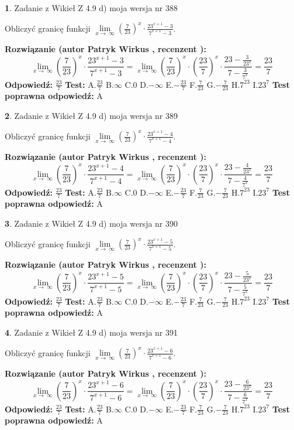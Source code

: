 \documentclass[12pt, a4paper]{article}
\theoremstyle{definition} %
\newtheorem{zad}{}
\newcommand{\zadStart}[1]{\begin{zad}#1\newline}
\newcommand{\zadStop}{\end{zad}}
\newcommand{\rozwStart}[2]{\noindent \textbf{Rozwiązanie (autor #1 , recenzent #2): }\newline}
\newcommand{\rozwStop}{\newline}
\newcommand{\odpStart}{\noindent \textbf{Odpowiedź:}\newline}
\newcommand{\odpStop}{\newline}
\newcommand{\testStart}{\noindent \textbf{Test:}\newline}
\newcommand{\testStop}{\newline}
\newcommand{\kluczStart}{\noindent \textbf{Test poprawna odpowiedź:}\newline}
\newcommand{\kluczStop}{\newline}
\begin{document}
\zadStart{Zadanie z Wikieł Z 4.9 d) moja wersja nr 388}


Obliczyć granicę funkcji  $\lim\limits_{x\to\ \infty}(\frac{7}{23})^{x}\cdot\frac{23^{x+1}-3}{7^{x+1}-3}$.
\zadStop
\rozwStart{Patryk Wirkus}{}
$$\lim\limits_{x\to\ \infty}(\frac{7}{23})^{x}\cdot\frac{23^{x+1}-3}{7^{x+1}-3}=\lim\limits_{x\to\ \infty}(\frac{7}{23})^{x}\cdot(\frac{23}{7})^{x} \cdot \frac{23-\frac{3}{23^{x}}}{7-\frac{3}{7^{x}}} = \frac{23}{7}$$
\rozwStop
\odpStart
$\frac{23}{7}$
\odpStop
\testStart
A.$\frac{23}{7}$ B.$\infty$ C.$0$ D.$-\infty$ E.$-\frac{23}{7}$
F.$\frac{7}{23}$ G.$-\frac{7}{23}$
H.$7^{23}$
I.$23^{7}$
\testStop
\kluczStart
A
\kluczStop



\zadStart{Zadanie z Wikieł Z 4.9 d) moja wersja nr 389}


Obliczyć granicę funkcji  $\lim\limits_{x\to\ \infty}(\frac{7}{23})^{x}\cdot\frac{23^{x+1}-4}{7^{x+1}-4}$.
\zadStop
\rozwStart{Patryk Wirkus}{}
$$\lim\limits_{x\to\ \infty}(\frac{7}{23})^{x}\cdot\frac{23^{x+1}-4}{7^{x+1}-4}=\lim\limits_{x\to\ \infty}(\frac{7}{23})^{x}\cdot(\frac{23}{7})^{x} \cdot \frac{23-\frac{4}{23^{x}}}{7-\frac{4}{7^{x}}} = \frac{23}{7}$$
\rozwStop
\odpStart
$\frac{23}{7}$
\odpStop
\testStart
A.$\frac{23}{7}$ B.$\infty$ C.$0$ D.$-\infty$ E.$-\frac{23}{7}$
F.$\frac{7}{23}$ G.$-\frac{7}{23}$
H.$7^{23}$
I.$23^{7}$
\testStop
\kluczStart
A
\kluczStop



\zadStart{Zadanie z Wikieł Z 4.9 d) moja wersja nr 390}


Obliczyć granicę funkcji  $\lim\limits_{x\to\ \infty}(\frac{7}{23})^{x}\cdot\frac{23^{x+1}-5}{7^{x+1}-5}$.
\zadStop
\rozwStart{Patryk Wirkus}{}
$$\lim\limits_{x\to\ \infty}(\frac{7}{23})^{x}\cdot\frac{23^{x+1}-5}{7^{x+1}-5}=\lim\limits_{x\to\ \infty}(\frac{7}{23})^{x}\cdot(\frac{23}{7})^{x} \cdot \frac{23-\frac{5}{23^{x}}}{7-\frac{5}{7^{x}}} = \frac{23}{7}$$
\rozwStop
\odpStart
$\frac{23}{7}$
\odpStop
\testStart
A.$\frac{23}{7}$ B.$\infty$ C.$0$ D.$-\infty$ E.$-\frac{23}{7}$
F.$\frac{7}{23}$ G.$-\frac{7}{23}$
H.$7^{23}$
I.$23^{7}$
\testStop
\kluczStart
A
\kluczStop



\zadStart{Zadanie z Wikieł Z 4.9 d) moja wersja nr 391}


Obliczyć granicę funkcji  $\lim\limits_{x\to\ \infty}(\frac{7}{23})^{x}\cdot\frac{23^{x+1}-6}{7^{x+1}-6}$.
\zadStop
\rozwStart{Patryk Wirkus}{}
$$\lim\limits_{x\to\ \infty}(\frac{7}{23})^{x}\cdot\frac{23^{x+1}-6}{7^{x+1}-6}=\lim\limits_{x\to\ \infty}(\frac{7}{23})^{x}\cdot(\frac{23}{7})^{x} \cdot \frac{23-\frac{6}{23^{x}}}{7-\frac{6}{7^{x}}} = \frac{23}{7}$$
\rozwStop
\odpStart
$\frac{23}{7}$
\odpStop
\testStart
A.$\frac{23}{7}$ B.$\infty$ C.$0$ D.$-\infty$ E.$-\frac{23}{7}$
F.$\frac{7}{23}$ G.$-\frac{7}{23}$
H.$7^{23}$
I.$23^{7}$
\testStop
\kluczStart
A
\kluczStop
\end{document}
